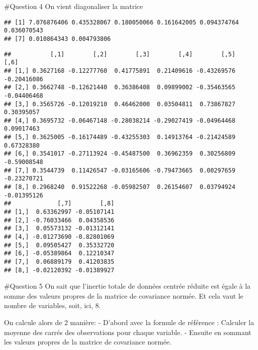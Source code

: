 \documentclass[
]{article}
\newenvironment{Shaded}{\begin{snugshade}}{\end{snugshade}}
\newcommand{\CommentTok}[1]{\textcolor[rgb]{0.56,0.35,0.01}{\textit{#1}}}
\newcommand{\FunctionTok}[1]{\textcolor[rgb]{0.13,0.29,0.53}{\textbf{#1}}}
\newcommand{\NormalTok}[1]{#1}
\newcommand{\OtherTok}[1]{\textcolor[rgb]{0.56,0.35,0.01}{#1}}
\newcommand{\SpecialCharTok}[1]{\textcolor[rgb]{0.81,0.36,0.00}{\textbf{#1}}}
\begin{document}
\#Question 4 On vient diagonaliser la matrice

\begin{Shaded}
\end{Shaded}

\begin{verbatim}
## [1] 7.076876406 0.435328067 0.180050066 0.161642005 0.094374764 0.036070543
## [7] 0.010864343 0.004793806
\end{verbatim}

\begin{Shaded}
\end{Shaded}

\begin{verbatim}
##           [,1]        [,2]        [,3]        [,4]        [,5]        [,6]
## [1,] 0.3627168 -0.12277760  0.41775891  0.21409616 -0.43269576 -0.20416086
## [2,] 0.3662748 -0.12621440  0.36386408  0.09899002 -0.35463565 -0.04406468
## [3,] 0.3565726 -0.12019210  0.46462000  0.03504811  0.73867827  0.30395057
## [4,] 0.3695732 -0.06467148 -0.28038214 -0.29027419 -0.04964468  0.09017463
## [5,] 0.3625005 -0.16174489 -0.43255303  0.14913764 -0.21424589  0.67328380
## [6,] 0.3541017 -0.27113924 -0.45487500  0.36962359  0.30256809 -0.59008548
## [7,] 0.3544739  0.11426547 -0.03165606 -0.79473665  0.00297659 -0.23270721
## [8,] 0.2968240  0.91522268 -0.05982507  0.26154607  0.03794924 -0.01395126
##             [,7]        [,8]
## [1,]  0.63362997 -0.05107141
## [2,] -0.76033466  0.04358536
## [3,]  0.05573132 -0.01312141
## [4,] -0.01273690 -0.82801069
## [5,]  0.09505427  0.35332720
## [6,] -0.05389864  0.12210347
## [7,]  0.06889179  0.41203835
## [8,] -0.02120392 -0.01389927
\end{verbatim}

\#Question 5 On sait que l'inertie totale de données centrée réduite est
égale à la somme des valeurs propres de la matrice de covariance normée.
Et cela vaut le nombre de variables, soit, ici, 8.

On calcule alors de 2 manière: - D'abord avec la formule de référence :
Calculer la moyenne des carrés des observations pour chaque variable. -
Ensuite en sommant les valeurs propres de la matrice de covariance
normée.
\end{document}
